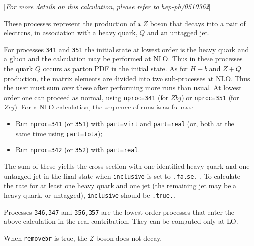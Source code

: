 \documentclass[12pt]{article}
\begin{document}
\begin{center}
[{\it For more details on this calculation, please refer to hep-ph/0510362}]
\end{center}

These processes represent the production of a $Z$
boson that decays into a pair of electrons,
in association with a heavy quark, $Q$ and an untagged jet.

For processes {\tt 341} and {\tt 351} the initial
state at lowest order is the heavy quark and a gluon and 
the calculation may be performed at NLO.
Thus in these processes the quark $Q$ occurs as 
parton PDF in the initial state. 
As for $H+b$ and $Z+Q$ production, the matrix elements are divided into two
sub-processes at NLO. Thus the user must sum over these after performing
more runs than usual. At lowest order one can proceed as normal, using
{\tt nproc=341} (for $Zbj$) or {\tt nproc=351} (for $Zcj$).
For a NLO calculation, the sequence of runs is as follows:
\begin{itemize}
\item Run {\tt nproc=341} (or {\tt 351}) with {\tt part=virt} and
{\tt part=real} (or, both at the same time using {\tt part=tota});
\item Run {\tt nproc=342} (or {\tt 352}) with {\tt part=real}.
\end{itemize}
The sum of these yields the cross-section with one identified heavy quark and one
untagged jet in
the final state when {\tt inclusive} is set to {\tt .false.} . To calculate the
rate for at least one heavy quark and one jet (the remaining jet may be a heavy quark,
or untagged), {\tt inclusive} should be {\tt .true.}.

Processes {\tt 346,347} and {\tt 356,357} are the lowest order processes that enter
the above calculation in the real contribution. They can be computed only at LO.

When {\tt removebr} is true, the $Z$ boson does not decay.
\end{document}
